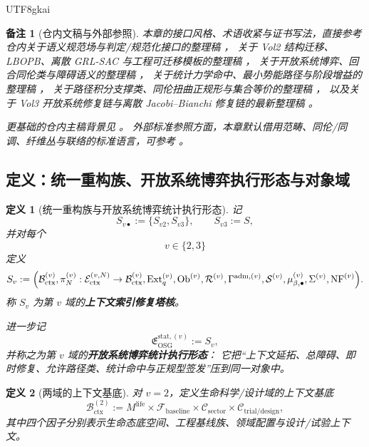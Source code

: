 \documentclass[12pt]{article}
\newtheorem{definition}{定义}[section]
\newtheorem{remark}{备注}[section]
\newcommand{\Ob}{\operatorname{Ob}}
\newcommand{\Ext}{\operatorname{Ext}}
\newcommand{\NF}{\operatorname{NF}}
\begin{document}
\begin{CJK*}{UTF8}{gkai}
\begin{remark}[仓内文稿与外部参照]
本章的接口风格、术语收紧与证书写法，直接参考仓内关于语义规范场与判定/规范化接口的整理稿
\cite{RepoTex20SemanticGaugeNormalization}，
关于 Vol2 结构迁移、LBOPB、离散 GRL-SAC 与工程可迁移模板的整理稿
\cite{RepoTex22Vol2InverseDesign}，
关于开放系统博弈、回合同伦类与障碍语义的整理稿
\cite{RepoTex23OpenSystemGame}，
关于统计力学命中、最小势能路径与阶段增益的整理稿
\cite{RepoTex28StatMechPath}，
关于路径积分支撑类、同伦扭曲正规形与集合等价的整理稿
\cite{RepoTex36HomotopyTwistBijection}，
以及关于 Vol3 开放系统修复链与离散 Jacobi--Bianchi 修复链的最新整理稿
\cite{RepoTex37SemanticGaugeRuntime,RepoTex38JacobiBianchiRepair}。

更基础的仓内主稿背景见
\cite{GaoZhengAppVol2,GaoZhengAppVol3,GaoZheng2025GFramework}。
外部标准参照方面，本章默认借用范畴、同伦/同调、纤维丛与联络的标准语言，可参考
\cite{MacLane1998Categories,Hatcher2002AT,Weibel1994HomologicalAlgebra,KobayashiNomizu1963Foundations,
  Husemoller1994FibreBundles}。
\end{remark}

\subsection{定义：统一重构族、开放系统博弈执行形态与对象域}
\label{subsec:tex39-ch1-definitions}

\begin{definition}[统一重构族与开放系统博弈统计执行形态]
\label{def:tex39-family}
记
\[
  S_{v\bullet}:=\{S_{v2},S_{v3}\},
  \qquad
  S_{v3}:=S,
\]
并对每个
\[
  v\in\{2,3\}
\]
定义
\[
  S_v
  :=
  \Bigl(
    \mathcal B_{\mathrm{ctx}}^{(v)},
    \pi_N^{(v)}:\mathcal E_{\mathrm{ctx}}^{(v,N)}\to \mathcal B_{\mathrm{ctx}}^{(v)},
    \Ext_q^{(v)},
    \Ob^{(v)},
    \mathcal R^{(v)},
    \Gamma^{\mathrm{adm},(v)},
    \mathcal S^{(v)},
    \mu_{\beta,\bullet}^{(v)},
    \Sigma^{(v)},
    \NF^{(v)}
  \Bigr).
\]
称 $S_v$ 为第 $v$ 域的\textbf{上下文索引修复塔核}。

进一步记
\[
  \mathfrak E_{\mathrm{OSG}}^{\mathrm{stat},(v)}
  :=
  S_v,
\]
并称之为第 $v$ 域的\textbf{开放系统博弈统计执行形态}：
它把“上下文延拓、总障碍、即时修复、允许路径类、统计命中与正规型签发”压到同一对象中。
\end{definition}

\begin{definition}[两域的上下文基底]
\label{def:tex39-base}
对 $v=2$，定义生命科学/设计域的上下文基底
\[
  \mathcal B_{\mathrm{ctx}}^{(2)}
  :=
  M^{\mathrm{life}}
  \times
  \mathcal F_{\mathrm{baseline}}
  \times
  \mathcal C_{\mathrm{sector}}
  \times
  \mathcal C_{\mathrm{trial/design}},
\]
其中四个因子分别表示生命态底空间、工程基线族、领域配置与设计/试验上下文。


\end{definition}
\end{CJK*}
\end{document}
